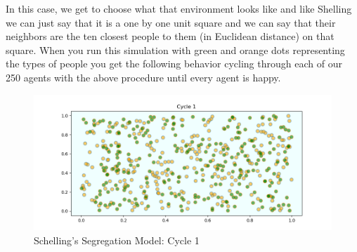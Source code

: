 \documentclass[12pt,twoside]{reedthesis}
\begin{document}
In this case, we get to choose what that environment looks like and like Shelling we can just say that it is a one by one unit square and we can say that their neighbors are the ten closest people to them (in Euclidean distance) on that square. When you run this simulation with green and orange dots representing the types of people you get the following behavior cycling through each of our 250 agents with the above procedure until every agent is happy.

\begin{figure}[h!]
	\centering
	\includegraphics[scale=0.5]{segregation_1}
	\caption{Schelling's Segregation Model: Cycle 1}
	\label{SSM1_ch1}
\end{figure}
\end{document}
